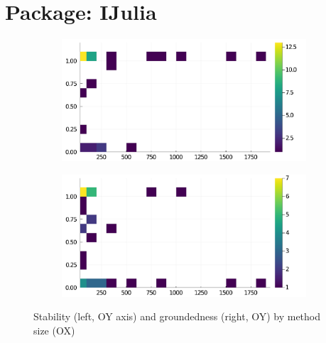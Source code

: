 \section*{Package: IJulia}
\begin{figure}[h]
     \begin{subfigure}[b]{0.49\textwidth}
       \includegraphics[width=\textwidth]{figs/all-package-graphs/IJulia-size-vs-stable.pdf}
     \end{subfigure}
     \begin{subfigure}[b]{0.49\textwidth}
       \includegraphics[width=\textwidth]{figs/all-package-graphs/IJulia-size-vs-grounded.pdf}
     \end{subfigure}
\caption{Stability (left, OY axis) and groundedness (right, OY) by method size (OX)}%
%
\label{figs:size:IJulia}
\end{figure}

